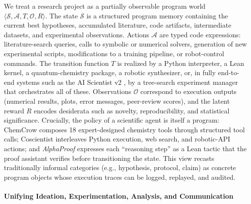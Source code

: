 \documentclass{llmxive}
\begin{document}
We treat a research project as a partially observable program world $\langle \mathcal{S}, \mathcal{A}, T, \mathcal{O}, R\rangle$. The state $\mathcal{S}$ is a structured program memory containing the current best hypotheses, accumulated literature, code artifacts, intermediate datasets, and experimental observations. Actions $\mathcal{A}$ are typed code expressions: literature-search queries, calls to symbolic or numerical solvers, generation of new experimental scripts, modifications to a training pipeline, or robot-control commands. The transition function $T$ is realized by a Python interpreter, a Lean kernel, a quantum-chemistry package, a robotic synthesizer, or, in fully end-to-end systems such as the AI Scientist v2 \citep{yamada2025aiscientistv2workshoplevelautomated}, by a tree-search experiment manager that orchestrates all of these. Observations $\mathcal{O}$ correspond to execution outputs (numerical results, plots, error messages, peer-review scores), and the latent reward $R$ encodes desiderata such as novelty, reproducibility, and statistical significance. Crucially, the policy of a scientific agent is itself a program: ChemCrow \citep{bran2023chemcrowaugmentinglargelanguagemodels} composes 18 expert-designed chemistry tools through structured tool calls; Coscientist \citep{boiko2023autonomous} interleaves Python execution, web search, and robotic-API actions; and \textit{AlphaProof} \citep{hubert2025olympiad} expresses each ``reasoning step'' as a Lean tactic that the proof assistant verifies before transitioning the state. This view recasts traditionally informal categories (e.g., hypothesis, protocol, claim) as concrete program objects whose execution traces can be logged, replayed, and audited.

\paragraph{Unifying Ideation, Experimentation, Analysis, and Communication}
\end{document}
